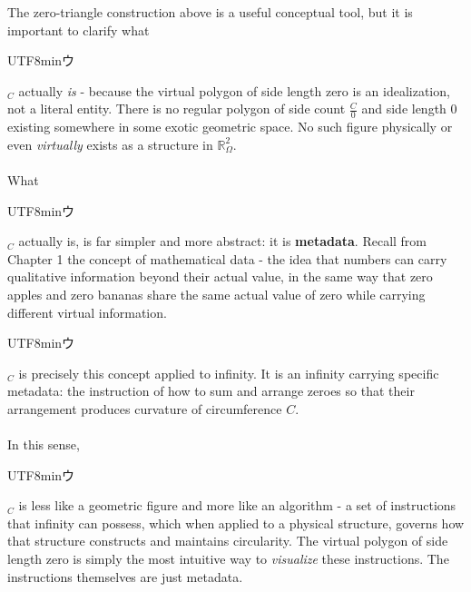 \documentclass{article}
\newcommand{\U}{\begin{CJK}{UTF8}{min}ウ\end{CJK}}
\begin{document}
The zero-triangle construction above is a useful conceptual tool, but it is 
important to clarify what \U$_C$ actually \textit{is} - because the virtual 
polygon of side length zero is an idealization, not a literal entity. There 
is no regular polygon of side count $\frac{C}{0}$ and side length $0$ existing 
somewhere in some exotic geometric space. No such figure physically or even 
\textit{virtually} exists as a structure in $\mathbb{R}_\Omega^2$.\\\\
What \U$_C$ actually is, is far simpler and more abstract: it is 
\textbf{metadata}. Recall from Chapter 1 the concept of mathematical data - 
the idea that numbers can carry qualitative information beyond their actual 
value, in the same way that zero apples and zero bananas share the same actual 
value of zero while carrying different virtual information. \U$_C$ is precisely 
this concept applied to infinity. It is an infinity carrying specific metadata: 
the instruction of how to sum and arrange zeroes so that their arrangement 
produces curvature of circumference $C$.\\\\
In this sense, \U$_C$ is less like a geometric figure and more like an 
algorithm - a set of instructions that infinity can possess, which when applied 
to a physical structure, governs how that structure constructs and maintains 
circularity. The virtual polygon of side length zero is simply the most 
intuitive way to \textit{visualize} these instructions. The instructions 
themselves are just metadata.
\end{document}
